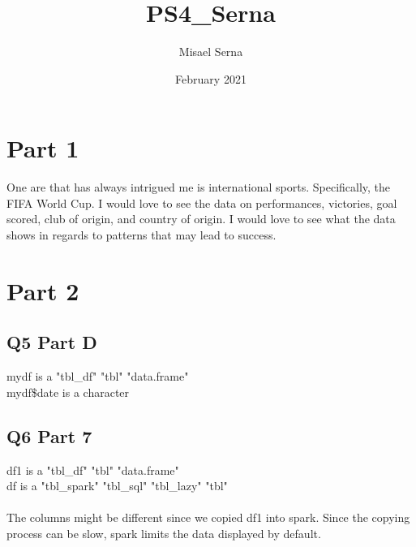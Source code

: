 \usepackage[utf8]{inputenc}

\title{PS4_Serna}
\author{Misael Serna}
\date{February 2021}

\usepackage{natbib}
\usepackage{graphicx}



\maketitle

\section{Part 1}
One are that has always intrigued me is international sports. Specifically, the FIFA World Cup. I would love to see the data on performances, victories, goal scored, club of origin, and country of origin. I would love to see what the data shows in regards to patterns that may lead to success. 


\section{Part 2}
\subsection{Q5 Part D}
mydf is a "tbl\_df" "tbl" "data.frame"\\
mydf\$date is a character\\
\subsection{Q6 Part 7}
df1 is a "tbl\_df" "tbl" "data.frame"\\
df is a "tbl\_spark" "tbl\_sql"   "tbl\_lazy"  "tbl"\\
\\
The columns might be different since we copied df1 into spark. Since the copying process can be slow, spark limits the data displayed by default. 

